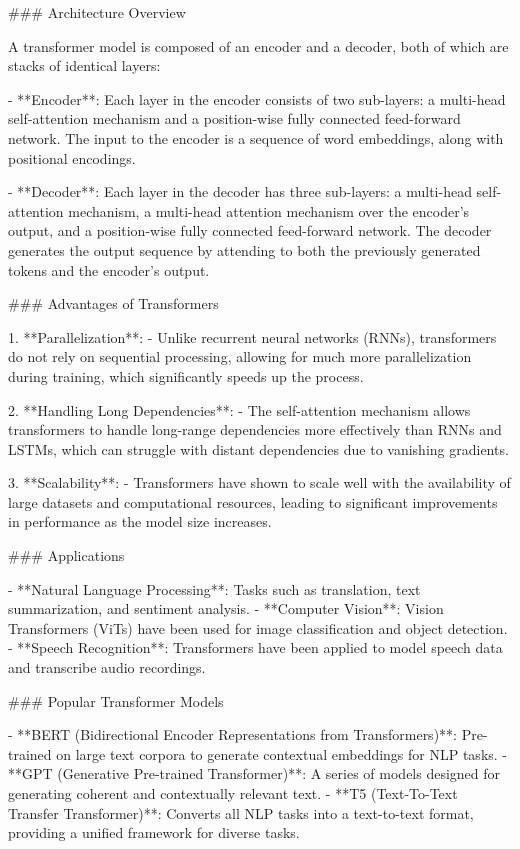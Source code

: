 ### Architecture Overview

A transformer model is composed of an encoder and a decoder, both of which are stacks of identical layers:

- **Encoder**: Each layer in the encoder consists of two sub-layers: a multi-head self-attention mechanism and a position-wise fully connected feed-forward network. The input to the encoder is a sequence of word embeddings, along with positional encodings.
  
- **Decoder**: Each layer in the decoder has three sub-layers: a multi-head self-attention mechanism, a multi-head attention mechanism over the encoder's output, and a position-wise fully connected feed-forward network. The decoder generates the output sequence by attending to both the previously generated tokens and the encoder's output.

### Advantages of Transformers

1. **Parallelization**:
   - Unlike recurrent neural networks (RNNs), transformers do not rely on sequential processing, allowing for much more parallelization during training, which significantly speeds up the process.

2. **Handling Long Dependencies**:
   - The self-attention mechanism allows transformers to handle long-range dependencies more effectively than RNNs and LSTMs, which can struggle with distant dependencies due to vanishing gradients.

3. **Scalability**:
   - Transformers have shown to scale well with the availability of large datasets and computational resources, leading to significant improvements in performance as the model size increases.

### Applications

- **Natural Language Processing**: Tasks such as translation, text summarization, and sentiment analysis.
- **Computer Vision**: Vision Transformers (ViTs) have been used for image classification and object detection.
- **Speech Recognition**: Transformers have been applied to model speech data and transcribe audio recordings.

### Popular Transformer Models

- **BERT (Bidirectional Encoder Representations from Transformers)**: Pre-trained on large text corpora to generate contextual embeddings for NLP tasks.
- **GPT (Generative Pre-trained Transformer)**: A series of models designed for generating coherent and contextually relevant text.
- **T5 (Text-To-Text Transfer Transformer)**: Converts all NLP tasks into a text-to-text format, providing a unified framework for diverse tasks.

